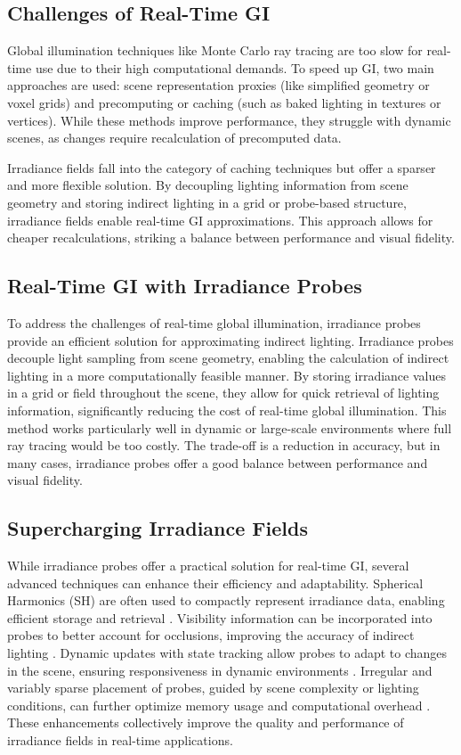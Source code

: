 \documentclass[acmtog, nonacm]{acmart}
\begin{document}
\subsection{Challenges of Real-Time GI}
Global illumination techniques like Monte Carlo ray tracing are too slow for real-time use due to their high computational demands. To speed up GI, two main approaches are used: scene representation proxies (like simplified geometry or voxel grids) and precomputing or caching (such as baked lighting in textures or vertices). While these methods improve performance, they struggle with dynamic scenes, as changes require recalculation of precomputed data.

Irradiance fields fall into the category of caching techniques but offer a sparser and more flexible solution. By decoupling lighting information from scene geometry and storing indirect lighting in a grid or probe-based structure, irradiance fields enable real-time GI approximations. This approach allows for cheaper recalculations, striking a balance between performance and visual fidelity.

\subsection{Real-Time GI with Irradiance Probes}
To address the challenges of real-time global illumination, irradiance probes provide an efficient solution for approximating indirect lighting. Irradiance probes decouple light sampling from scene geometry, enabling the calculation of indirect lighting in a more computationally feasible manner. By storing irradiance values in a grid or field throughout the scene, they allow for quick retrieval of lighting information, significantly reducing the cost of real-time global illumination. This method works particularly well in dynamic or large-scale environments where full ray tracing would be too costly. The trade-off is a reduction in accuracy, but in many cases, irradiance probes offer a good balance between performance and visual fidelity.

\subsection{Supercharging Irradiance Fields}
\label{sec:extend}
While irradiance probes offer a practical solution for real-time GI, several advanced techniques can enhance their efficiency and adaptability. Spherical Harmonics (SH) are often used to compactly represent irradiance data, enabling efficient storage and retrieval \cite{sloan2008stupid, schneider2017efficient}. Visibility information can be incorporated into probes to better account for occlusions, improving the accuracy of indirect lighting \cite{silvennoinen2017real}. Dynamic updates with state tracking allow probes to adapt to changes in the scene, ensuring responsiveness in dynamic environments \cite{sedlacek2019real, datta2023adaptive}. Irregular and variably sparse placement of probes, guided by scene complexity or lighting conditions, can further optimize memory usage and computational overhead \cite{vardis2015efficient}. These enhancements collectively improve the quality and performance of irradiance fields in real-time applications.
\end{document}
